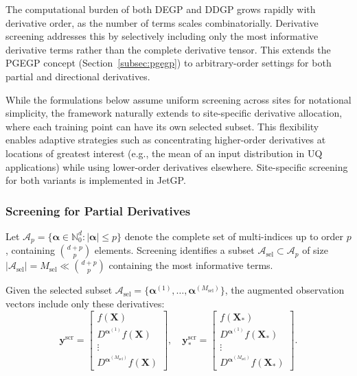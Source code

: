 \documentclass[12pt]{article}
\begin{document}
The computational burden of both DEGP and DDGP grows rapidly with derivative order, as the number of terms scales combinatorially. Derivative screening addresses this by selectively including only the most informative derivative terms rather than the complete derivative tensor. This extends the PGEGP concept (Section~\ref{subsec:pgegp}) to arbitrary-order settings for both partial and directional derivatives.

While the formulations below assume uniform screening across sites for notational simplicity, the framework naturally extends to site-specific derivative allocation, where each training point can have its own selected subset. This flexibility enables adaptive strategies such as concentrating higher-order derivatives at locations of greatest interest (e.g., the mean of an input distribution in UQ applications) while using lower-order derivatives elsewhere. Site-specific screening for both variants is implemented in JetGP.

\subsubsection{Screening for Partial Derivatives}
\label{subsubsec:partial_screening}

Let $\mathcal{A}_p = \{\boldsymbol{\alpha} \in \mathbb{N}_0^d : |\boldsymbol{\alpha}| \leq p\}$ denote the complete set of multi-indices up to order $p$, containing $\binom{d+p}{p}$ elements. Screening identifies a subset $\mathcal{A}_{\text{sel}} \subset \mathcal{A}_p$ of size $|\mathcal{A}_{\text{sel}}| = M_{\text{sel}} \ll \binom{d+p}{p}$ containing the most informative terms.

Given the selected subset $\mathcal{A}_{\text{sel}} = \{\boldsymbol{\alpha}^{(1)}, \ldots, \boldsymbol{\alpha}^{(M_{\text{sel}})}\}$, the augmented observation vectors include only these derivatives:
\begin{equation}
	\label{eqn:screened_aug_vectors}
	\mathbf{y}^{\text{scr}} = \begin{bmatrix} 
		f(\mathbf{X}) \\ 
		D^{\boldsymbol{\alpha}^{(1)}} f(\mathbf{X}) \\ 
		\vdots \\ 
		D^{\boldsymbol{\alpha}^{(M_{\text{sel}})}} f(\mathbf{X})
	\end{bmatrix}, \quad
	\mathbf{y}^{\text{scr}}_* = \begin{bmatrix} 
		f(\mathbf{X}_*) \\ 
		D^{\boldsymbol{\alpha}^{(1)}} f(\mathbf{X}_*) \\ 
		\vdots \\ 
		D^{\boldsymbol{\alpha}^{(M_{\text{sel}})}} f(\mathbf{X}_*)
	\end{bmatrix}.
\end{equation}
\end{document}
